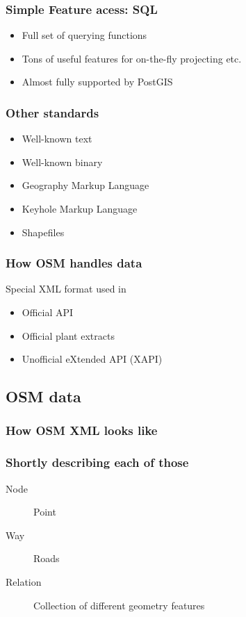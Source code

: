\documentclass{beamer}
\begin{document}
\begin{frame}
  \frametitle{Simple Feature acess: SQL}
  \begin{itemize}
  \item Full set of querying functions
  \item Tons of useful features for on-the-fly projecting etc.
  \item Almost fully supported by PostGIS
  \end{itemize}
\end{frame}

\begin{frame}
  \frametitle{Other standards}
  \begin{itemize}
  \item Well-known text
  \item Well-known binary
  \item Geography Markup Language
  \item Keyhole Markup Language
  \item Shapefiles
  \end{itemize}
\end{frame}

\begin{frame}
  \frametitle{How OSM handles data}
  Special XML format used in
  \begin{itemize}
  \item Official API
  \item Official plant extracts
  \item Unofficial eXtended API (XAPI)
  \end{itemize}
\end{frame}

\subsection{OSM data}

\begin{frame}[fragile]
  \frametitle{How OSM XML looks like}
  
\end{frame}

\begin{frame}
  \frametitle{Shortly describing each of those}
  \begin{description}
  \item[Node] Point
  \item[Way] Roads
  \item[Relation] Collection of different geometry features
  \end{description}
\end{frame}
\end{document}
